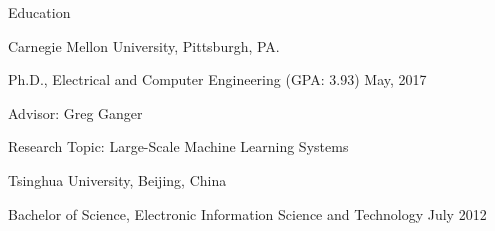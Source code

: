 \documentclass{resume} %
\begin{document}
\begin{rSection}{Education}

\begin{rSubsection}{\hspace{-1em} Carnegie Mellon University, Pittsburgh, PA.}{}{}{}
\vspace{-0.3em}
\item[] \hspace{-2em} Ph.D., Electrical and Computer Engineering (GPA: 3.93) \hfill May, 2017
\item Advisor: Greg Ganger
\item Research Topic: Large-Scale Machine Learning Systems
\end{rSubsection}
\vspace{-.1in}

\begin{rSubsection}{\hspace{-1em} Tsinghua University, Beijing, China}{}{}{}
\vspace{-0.3em}
\item[] \hspace{-2em} Bachelor of Science, Electronic Information Science and Technology \hfill July 2012
\end{rSubsection}

\end{rSection}
\vspace{-.05in}
\end{document}
